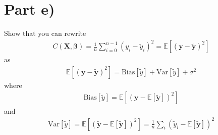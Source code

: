 \documentclass[%
reprint,
amsmath,amssymb,
aps,
]{revtex4-2}
\begin{document}
\section*{Part e)}
Show that you can rewrite
\begin{align*}
	C(\bm X,\bm \beta)=\frac{1}{n}\sum_{i=0}^{n-1}(y_i-\tilde y_i)^2=\mathbb{E}[(\bm y-\tilde{\bm y})^2]
\end{align*}
as
\begin{align*}
	\mathbb{E}[(\bm y-\tilde{\bm y})^2]=\text{Bias}[\tilde y]+\text{Var}[\tilde{y}]+\sigma^2
\end{align*}
where
\begin{align*}
	\text{Bias}[\tilde y]=\mathbb{E}\!\left[(\bm y-\mathbb{E}[\tilde{\bm y}])^2\right]
\end{align*}
and
\begin{align*}
	\text{Var}[\tilde{y}]=\mathbb{E}\!\left[(\tilde{\bm y}-\mathbb{E}[\tilde{\bm y}])^2\right]=\frac{1}{n}\sum_i(\tilde y_i-\mathbb{E}[\tilde{\bm y}])^2
\end{align*}
	
\end{document}

